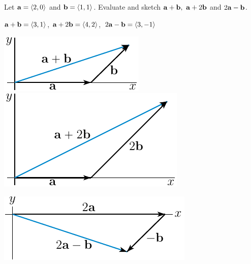 


\subsection*{\Conceptual}

\begin{question}
Let $\mathbf{a}=\left< 2,0\right> $ and $\mathbf{b}=\left< 1,1\right> $. Evaluate and sketch
$\mathbf{a}+\mathbf{b},\ \mathbf{a}+2\mathbf{b}$ and $2\mathbf{a}-\mathbf{b}$.
\end{question}


\begin{answer}
$\mathbf{a}+\mathbf{b}=\left< 3,1\right> $, $\mathbf{a}+2\mathbf{b}=\left< 4,2\right> $,\ 
$2\mathbf{a}-\mathbf{b}=\left< 3,-1\right> $

\begin{center}
     \includegraphics{fig/add1.pdf}\qquad
     \includegraphics{fig/add2.pdf}
\end{center}
\begin{center}
     \includegraphics{fig/add3.pdf}
\end{center}

\end{answer}

